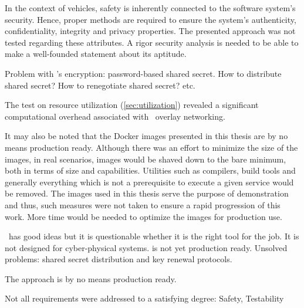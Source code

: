 In the context of vehicles, safety is inherently connected to the software system's security. Hence, proper methods are required to ensure the system's authenticity, confidentiality, integrity and privacy properties. The presented approach was not tested regarding these attributes. A rigor security analysis is needed to be able to make a well-founded statement about its aptitude.

Problem with \wnet 's encryption: password-based shared secret. How to distribute shared secret? How to renegotiate shared secret? etc.

The test on resource utilization (\cf \autoref{sec:utilization}) revealed a significant computational overhead associated with \wnet\ overlay networking. 

It may also be noted that the Docker images presented in this thesis are by no means production ready. Although there was an effort to minimize the size of the images, in real scenarios, images would be shaved down to the bare minimum, both in terms of size and capabilities. Utilities such as compilers, build tools and generally everything which is not a prerequisite to execute a given service would be removed. The images used in this thesis serve the purpose of demonstration and thus, such measures were not taken to ensure a rapid progression of this work. More time would be needed to optimize the images for production use.



\weave\ has good ideas but it is questionable whether it is the right tool for the job. It is not designed for cyber-physical systems. is not yet production ready. Unsolved problems: shared secret distribution and key renewal protocols.


The approach is by no means production ready.


Not all requirements were addressed to a satisfying degree: Safety, Testability

